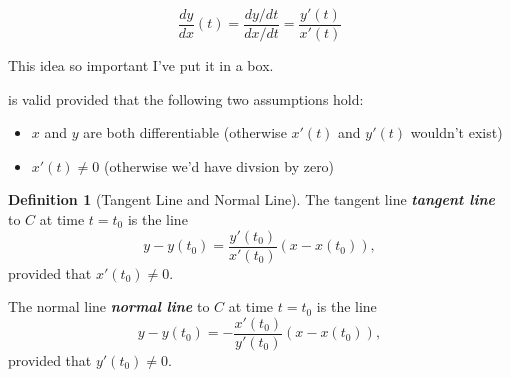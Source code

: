 \documentclass[10pt]{article}
\DeclareRobustCommand{\demph}[1]{%
  \ifmmode
  {\color{Blue}#1}%
  \else
  {\color{Blue}\bfseries\slshape #1}%
  \fi
}
\theoremstyle{definition}
\newtheorem{definition}[theorem]{Definition}
\newcommand{\1}[1]{\textbf{1}_{\left[#1\right]}} %
\begin{document}
\begin{center}
  \colorbox{gray!20}{%
    \begin{minipage}{0.8\textwidth}
      \begin{equation}\label{eq:dydx-of-parametric-curve}
        \frac{dy}{dx}(t) = \frac{dy/dt}{dx/dt}=\frac{y'(t)}{x'(t)}
      \end{equation}
    \end{minipage}%
  }
\end{center}
This idea so important I've put it in a box.

 is valid provided that the following
two assumptions hold:
\begin{itemize}
  \item $x$ and $y$ are both differentiable (otherwise $x'(t)$ and $y'(t)$ wouldn't exist)
  \item $x'(t)\neq 0$ (otherwise we'd have divsion by zero)
\end{itemize}

\begin{definition}[Tangent Line and Normal Line]
  \label{def:tangent-line-and-normal-line}
  The \demph{tangent line} to $C$ at time $t=t_{0}$ is the line
  \begin{equation*}
    y-y(t_0) = \frac{y'(t_0)}{x'(t_0)}\left(x-x(t_0)\right),
  \end{equation*}
  provided that $x'(t_{0})\neq 0$. 

  The \demph{normal line} to $C$ at time $t=t_{0}$ is the line
  \begin{equation*}
    y-y(t_0) = -\frac{x'(t_0)}{y'(t_0)}\left(x-x(t_0)\right),
  \end{equation*}
  provided that $y'(t_{0})\neq 0$. 
\end{definition}
\end{document}

